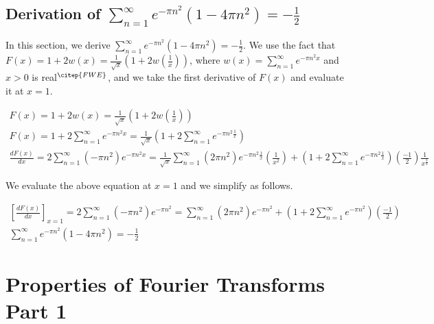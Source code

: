 \documentclass[11pt]{elsarticle}
\begin{document}
\subsection{\label{sec:appendix_H_2} \textbf{Derivation of  $\sum\limits_{n=1}^{\infty} e^{- \pi n^{2}} (1 - 4 \pi n^{2} )  = -\frac{1}{2}$  } \protect\\  \lowercase{} }

In this section, we derive $\sum\limits_{n=1}^{\infty} e^{- \pi n^{2}} (1 - 4 \pi n^{2} )  = -\frac{1}{2}$. We use the fact that  $F(x) = 1 + 2 w(x) = \frac{1}{\sqrt{x}} (1 + 2 w(\frac{1}{x}) )$, where $w(x) = \sum\limits_{n=1}^{\infty} e^{- \pi n^{2}x }$ and $x > 0$ is real$^{\citep{FWE}}$, and we take the first derivative of $F(x)$ and evaluate it at $x=1$.

\begin{eqnarray*}\label{sec:App_H_2_eq_1} 
F(x) = 1 + 2 w(x) = \frac{1}{\sqrt{x}} (1 + 2 w(\frac{1}{x}) ) \\
F(x) = 1 + 2 \sum\limits_{n=1}^{\infty} e^{- \pi n^{2}x } = \frac{1}{\sqrt{x}} (1 + 2 \sum\limits_{n=1}^{\infty} e^{- \pi n^{2}\frac{1}{x} } ) \\
\frac{dF(x)}{dx} = 2 \sum\limits_{n=1}^{\infty} (- \pi n^{2}) e^{- \pi n^{2}x } = \frac{1}{\sqrt{x}}  \sum\limits_{n=1}^{\infty} (2 \pi n^{2}) e^{- \pi n^{2}\frac{1}{x} } (\frac{1}{x^2})  + (1 + 2 \sum\limits_{n=1}^{\infty} e^{- \pi n^{2}\frac{1}{x} } )  (\frac{-1}{2}) \frac{1}{x^{\frac{3}{2}}}
\end{eqnarray*}
\begin{equation} \end{equation}

We evaluate the above equation at $x=1$ and we simplify as follows.


\begin{eqnarray*}\label{sec:App_H_2_eq_2} 
[ \frac{dF(x)}{dx} ]_{x=1} = 2 \sum\limits_{n=1}^{\infty} (- \pi n^{2}) e^{- \pi n^{2} } =  \sum\limits_{n=1}^{\infty} (2 \pi n^{2}) e^{- \pi n^{2} }   + (1 + 2 \sum\limits_{n=1}^{\infty} e^{- \pi n^{2} } )  (\frac{-1}{2})  \\
\sum\limits_{n=1}^{\infty} e^{- \pi n^{2}} (1 - 4 \pi n^{2} )  = -\frac{1}{2}
\end{eqnarray*}
\begin{equation} \end{equation}





\section{\label{sec:appendix_I} Properties of Fourier Transforms Part 1 \protect\\  \lowercase{} }
\end{document}
